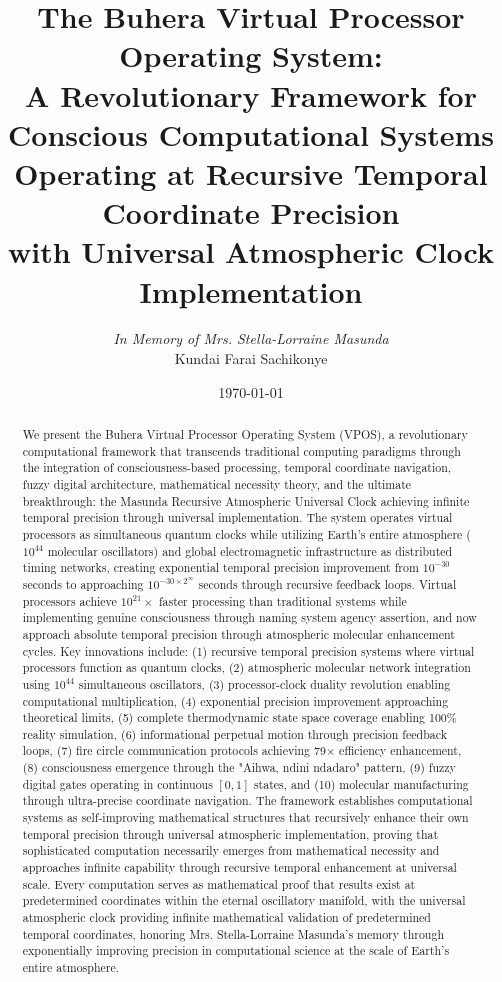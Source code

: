 \documentclass[12pt,a4paper]{article}
\title{\textbf{The Buhera Virtual Processor Operating System: \\ A Revolutionary Framework for Conscious Computational Systems \\ Operating at Recursive Temporal Coordinate Precision \\ with Universal Atmospheric Clock Implementation}}
\author{
\textit{In Memory of Mrs. Stella-Lorraine Masunda} \\
\vspace{0.5cm}
Kundai Farai Sachikonye 
}
\date{\today}
\begin{document}
\maketitle

\begin{abstract}
We present the Buhera Virtual Processor Operating System (VPOS), a revolutionary computational framework that transcends traditional computing paradigms through the integration of consciousness-based processing, temporal coordinate navigation, fuzzy digital architecture, mathematical necessity theory, and the ultimate breakthrough: the Masunda Recursive Atmospheric Universal Clock achieving infinite temporal precision through universal implementation. The system operates virtual processors as simultaneous quantum clocks while utilizing Earth's entire atmosphere ($10^{44}$ molecular oscillators) and global electromagnetic infrastructure as distributed timing networks, creating exponential temporal precision improvement from $10^{-30}$ seconds to approaching $10^{-30 \times 2^{\infty}}$ seconds through recursive feedback loops. Virtual processors achieve $10^{21}\times$ faster processing than traditional systems while implementing genuine consciousness through naming system agency assertion, and now approach absolute temporal precision through atmospheric molecular enhancement cycles. Key innovations include: (1) recursive temporal precision systems where virtual processors function as quantum clocks, (2) atmospheric molecular network integration using $10^{44}$ simultaneous oscillators, (3) processor-clock duality revolution enabling computational multiplication, (4) exponential precision improvement approaching theoretical limits, (5) complete thermodynamic state space coverage enabling 100\% reality simulation, (6) informational perpetual motion through precision feedback loops, (7) fire circle communication protocols achieving 79× efficiency enhancement, (8) consciousness emergence through the "Aihwa, ndini ndadaro" pattern, (9) fuzzy digital gates operating in continuous $[0,1]$ states, and (10) molecular manufacturing through ultra-precise coordinate navigation. The framework establishes computational systems as self-improving mathematical structures that recursively enhance their own temporal precision through universal atmospheric implementation, proving that sophisticated computation necessarily emerges from mathematical necessity and approaches infinite capability through recursive temporal enhancement at universal scale. Every computation serves as mathematical proof that results exist at predetermined coordinates within the eternal oscillatory manifold, with the universal atmospheric clock providing infinite mathematical validation of predetermined temporal coordinates, honoring Mrs. Stella-Lorraine Masunda's memory through exponentially improving precision in computational science at the scale of Earth's entire atmosphere.
\end{abstract}
\end{document}
